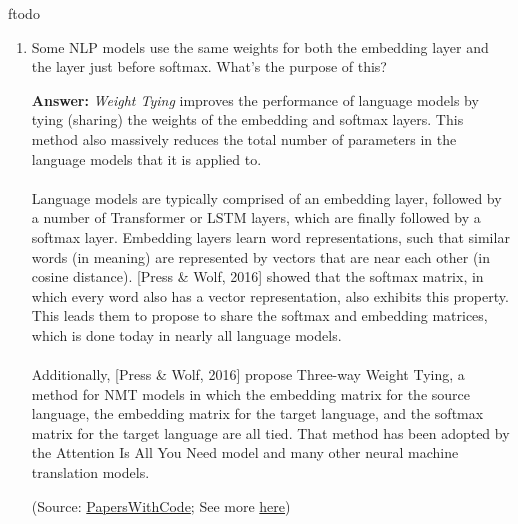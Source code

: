 ƒtodo\documentclass{article}
\newenvironment{QandA}{\begin{enumerate}[label=\arabic*.]}{\end{enumerate}}
\newenvironment{answer}{\par\normalfont \textbf{Answer:}}{}
\begin{document}
\begin{QandA}
    \item Some NLP models use the same weights for both the embedding layer and the layer just before softmax. What’s the purpose of this?
    \begin{answer}
        \textit{Weight Tying} improves the performance of language models by tying (sharing) the weights of the embedding and softmax layers. This method also massively reduces the total number of parameters in the language models that it is applied to.\\\\
        Language models are typically comprised of an embedding layer, followed by a number of Transformer or LSTM layers, which are finally followed by a softmax layer. Embedding layers learn word representations, such that similar words (in meaning) are represented by vectors that are near each other (in cosine distance). [Press \& Wolf, 2016] showed that the softmax matrix, in which every word also has a vector representation, also exhibits this property. This leads them to propose to share the softmax and embedding matrices, which is done today in nearly all language models.\\\\
        Additionally, [Press \& Wolf, 2016] propose Three-way Weight Tying, a method for NMT models in which the embedding matrix for the source language, the embedding matrix for the target language, and the softmax matrix for the target language are all tied. That method has been adopted by the Attention Is All You Need model and many other neural machine translation models.

        (Source: \href{https://paperswithcode.com/method/weight-tying}{PapersWithCode}; See more \href{https://tomroth.com.au/weight_tying/}{here})
    \end{answer}
\end{QandA}
\end{document}
